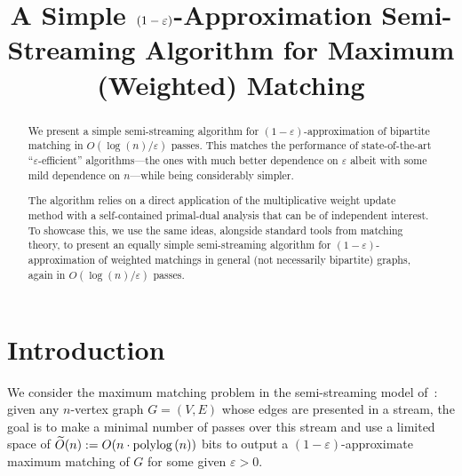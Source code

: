 \documentclass{theoretics}
\title{A Simple \texorpdfstring{$(1-\eps)$}{(1-eps)}-Approximation Semi-Streaming Algorithm for Maximum (Weighted) Matching} %
\newcommand{\Ot}{\widetilde{O}}
\newcommand{\eps}{\varepsilon}
\newcommand{\poly}{\mbox{\rm poly}}
\begin{document}
\maketitle




\begin{abstract}


	We present a simple semi-streaming algorithm for $(1-\eps)$-approximation of bipartite matching in $O(\log{\!(n)}/\eps)$ passes. This 
	matches the performance of state-of-the-art ``$\eps$-efficient'' algorithms---the ones with much better dependence on  $\eps$ albeit with some mild dependence on $n$---while being considerably simpler. 
	
	
	The algorithm relies on a direct application of the multiplicative weight update method with a self-contained primal-dual analysis that can be of  independent interest. 
	To showcase this, we use the same ideas, alongside standard tools from matching  theory, to present an equally simple semi-streaming algorithm for $(1-\eps)$-approximation of weighted matchings in general (not necessarily bipartite) 
	graphs, again in $O(\log{\!(n)}/\eps)$ passes. 
\end{abstract}









\section{Introduction}\label{sec:intro}

We consider the maximum matching problem in the semi-streaming model of~\cite{FeigenbaumKMSZ05}: given any $n$-vertex graph $G=(V,E)$ whose edges are presented in a stream, the goal is to make a minimal number of passes
over this stream and use a limited space of $\Ot(n):= O(n \cdot \poly\!\log{(n)})$ bits to output a $(1-\eps)$-approximate maximum matching of $G$ for some given $\eps > 0$. 
\end{document}
